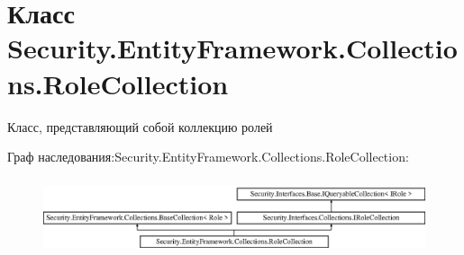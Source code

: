\hypertarget{class_security_1_1_entity_framework_1_1_collections_1_1_role_collection}{}\section{Класс Security.\+Entity\+Framework.\+Collections.\+Role\+Collection}
\label{class_security_1_1_entity_framework_1_1_collections_1_1_role_collection}


Класс, представляющий собой коллекцию ролей  


Граф наследования\+:Security.\+Entity\+Framework.\+Collections.\+Role\+Collection\+:\begin{figure}[H]
\begin{center}
\leavevmode
\includegraphics[height=2.282609cm]{da/d43/class_security_1_1_entity_framework_1_1_collections_1_1_role_collection}
\end{center}
\end{figure}
